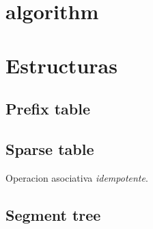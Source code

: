 

\def\title{Robado de Caloventor}
\tableofcontents\newpage
 
\section{algorithm}%



\section{Estructuras}%
\subsection{Prefix table}
\subsection{Sparse table}
Operacion asociativa \emph{idempotente}.
\subsection{Segment tree}
